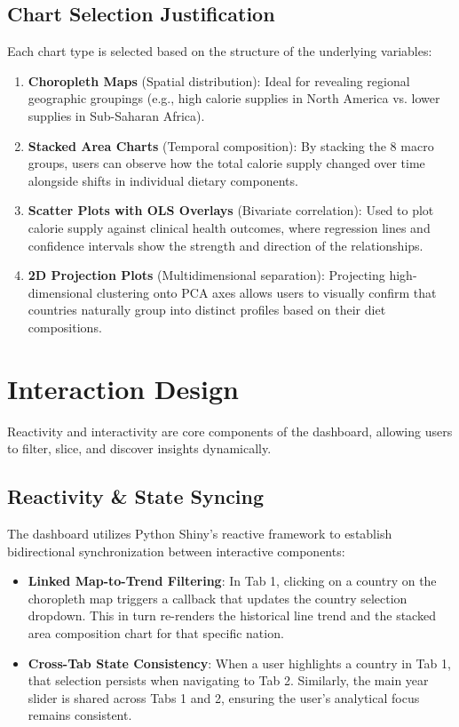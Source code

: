 \documentclass[10pt, a4paper]{article}
\begin{document}
\subsection{Chart Selection Justification}
Each chart type is selected based on the structure of the underlying variables:
\begin{enumerate}[nosep, leftmargin=1.5em]
    \item \textbf{Choropleth Maps} (Spatial distribution): Ideal for revealing regional geographic groupings (e.g., high calorie supplies in North America vs. lower supplies in Sub-Saharan Africa).
    \item \textbf{Stacked Area Charts} (Temporal composition): By stacking the 8 macro groups, users can observe how the total calorie supply changed over time alongside shifts in individual dietary components.
    \item \textbf{Scatter Plots with OLS Overlays} (Bivariate correlation): Used to plot calorie supply against clinical health outcomes, where regression lines and confidence intervals show the strength and direction of the relationships.
    \item \textbf{2D Projection Plots} (Multidimensional separation): Projecting high-dimensional clustering onto PCA axes allows users to visually confirm that countries naturally group into distinct profiles based on their diet compositions.
\end{enumerate}

\section{Interaction Design}
\label{sec:interaction}

Reactivity and interactivity are core components of the dashboard, allowing users to filter, slice, and discover insights dynamically.

\subsection{Reactivity \& State Syncing}
The dashboard utilizes Python Shiny's reactive framework to establish bidirectional synchronization between interactive components:
\begin{itemize}[nosep, leftmargin=1.5em]
    \item \textbf{Linked Map-to-Trend Filtering}: In Tab 1, clicking on a country on the choropleth map triggers a callback that updates the country selection dropdown. This in turn re-renders the historical line trend and the stacked area composition chart for that specific nation.
    \item \textbf{Cross-Tab State Consistency}: When a user highlights a country in Tab 1, that selection persists when navigating to Tab 2. Similarly, the main year slider is shared across Tabs 1 and 2, ensuring the user's analytical focus remains consistent.
\end{itemize}
\end{document}
